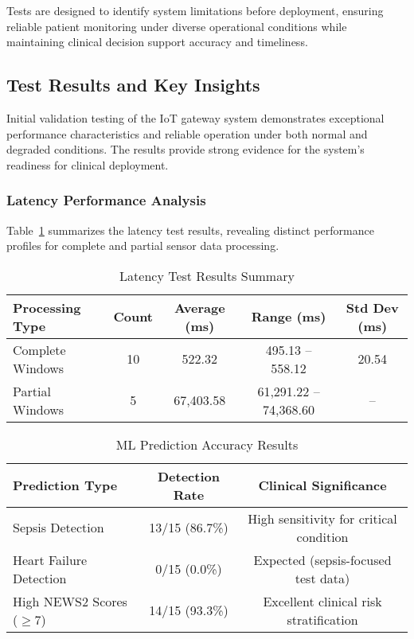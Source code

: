 Tests are designed to identify system limitations before deployment, ensuring reliable patient monitoring under diverse operational conditions while maintaining clinical decision support accuracy and timeliness.

\subsection{Test Results and Key Insights}
\label{subsec:test-results}

Initial validation testing of the IoT gateway system demonstrates exceptional performance characteristics and reliable operation under both normal and degraded conditions. The results provide strong evidence for the system's readiness for clinical deployment.

\subsubsection{Latency Performance Analysis}

Table~\ref{tab:latency-results} summarizes the latency test results, revealing distinct performance profiles for complete and partial sensor data processing.

\begin{table}[htb]
\centering
\caption{Latency Test Results Summary}
\label{tab:latency-results}
\begin{tabular}{|l|c|c|c|c|}
\hline
\textbf{Processing Type} & \textbf{Count} & \textbf{Average (ms)} & \textbf{Range (ms)} & \textbf{Std Dev (ms)} \\
\hline
Complete Windows & 10 & 522.32 & 495.13 -- 558.12 & 20.54 \\
\hline
Partial Windows & 5 & 67,403.58 & 61,291.22 -- 74,368.60 & -- \\
\hline
\end{tabular}
\end{table}

\begin{table}[htb]
\centering
\caption{ML Prediction Accuracy Results}
\label{tab:ml-accuracy}
\begin{tabular}{|l|c|c|}
\hline
\textbf{Prediction Type} & \textbf{Detection Rate} & \textbf{Clinical Significance} \\
\hline
Sepsis Detection & 13/15 (86.7\%) & High sensitivity for critical condition \\
\hline
Heart Failure Detection & 0/15 (0.0\%) & Expected (sepsis-focused test data) \\
\hline
High NEWS2 Scores ($\geq$7) & 14/15 (93.3\%) & Excellent clinical risk stratification \\
\hline
\end{tabular}
\end{table}

